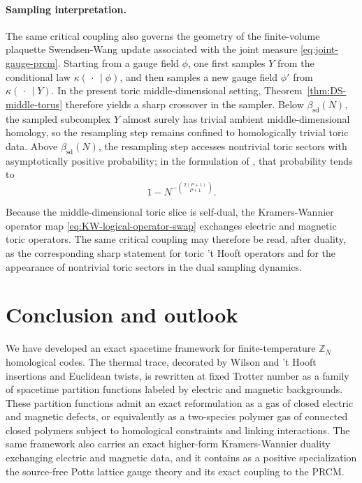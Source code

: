 \documentclass[dvipsnames,a4paper]{article}
\numberwithin{equation}{section}
\theoremstyle{definition}
\theoremstyle{remark}
\begin{document}
\paragraph{Sampling interpretation.}
The same critical coupling also governs the geometry of the finite-volume
plaquette Swendsen-Wang update \cite{SwendsenWang87} associated with the joint measure
\eqref{eq:joint-gauge-prcm}. Starting from a gauge field \(\phi\), one first
samples \(Y\) from the conditional law \(\kappa(\,\cdot\,\mid \phi)\), and then
samples a new gauge field \(\phi'\) from \(\kappa(\,\cdot\,\mid Y)\). In the
present toric middle-dimensional setting, Theorem~\ref{thm:DS-middle-torus}
therefore yields a sharp crossover in the sampler. Below
\(\beta_{\mathrm{sd}}(N)\), the sampled subcomplex \(Y\) almost surely has
trivial ambient middle-dimensional homology, so the resampling step remains
confined to homologically trivial toric data. Above
\(\beta_{\mathrm{sd}}(N)\), the resampling step accesses nontrivial toric
sectors with asymptotically positive probability; in the formulation of
\cite[\S5.1]{DuncanSchweinhartTopological}, that probability tends to
\begin{equation}
	1-N^{-\binom{2(P+1)}{P+1}}.
	\label{eq:nonlocal-move-probability}
\end{equation}

Because the middle-dimensional toric slice is self-dual, the
Kramers-Wannier operator map \eqref{eq:KW-logical-operator-swap} exchanges
electric and magnetic toric operators. The same critical coupling may therefore
be read, after duality, as the corresponding sharp statement for toric 't Hooft
operators and for the appearance of nontrivial toric sectors in the dual
sampling dynamics.






\section{Conclusion and outlook}
\label{sec:conclusion}

We have developed an exact spacetime framework for finite-temperature
\(\mathbb Z_N\) homological codes.  The thermal trace, decorated by Wilson and
't Hooft insertions and Euclidean twists, is rewritten at fixed Trotter number
as a family of spacetime partition functions labeled by electric and magnetic
backgrounds.  These partition functions admit an exact reformulation as a gas of closed
electric and magnetic defects, or equivalently as a two-species polymer gas of
connected closed polymers subject to homological constraints and linking
interactions.  The same framework also carries an exact higher-form
Kramers-Wannier duality exchanging electric and magnetic data, and it contains
as a positive specialization the source-free Potts lattice gauge theory and its
exact coupling to the PRCM.
\end{document}
